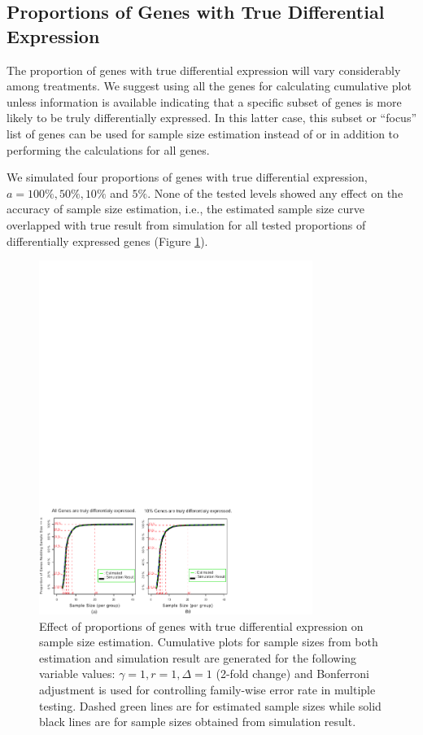 \documentclass{bioinfo}
\begin{document}
\subsection{Proportions of Genes with True Differential Expression}

The proportion of genes with true differential expression will
vary considerably among treatments. We suggest using all the genes
for calculating cumulative plot unless information is available
indicating that a specific subset of genes is more likely to be
truly differentially expressed. In this latter case, this subset
or ``focus'' list of genes can be used for sample size estimation
instead of or in addition to performing the calculations for all
genes.

We simulated four proportions of genes with true differential
expression, $a = 100\%, 50\%, 10\%$ and $5\%$. None of the tested
levels showed any effect on the accuracy of sample size
estimation, i.e., the estimated sample size curve overlapped with
true result from simulation for all tested proportions of
differentially expressed genes (Figure \ref{fig:ResAlt}).

\begin{figure}[h]
  \centerline{\includegraphics*[width=3.5in]{ResAlt.pdf}}
  \caption[Effect of proportions of genes with true differential expression on sample size estimation]
  {Effect of proportions of genes with true differential expression on sample size estimation.
    Cumulative plots for sample sizes from both estimation and simulation result
    are generated for the following variable values: $\gamma = 1, r = 1, \Delta = 1$ (2-fold
    change) and Bonferroni adjustment is used for controlling family-wise error rate in multiple testing. Dashed green lines are for estimated sample sizes
    while solid black lines are for sample sizes obtained from simulation result.}
  \label{fig:ResAlt}
\end{figure}
\end{document}
